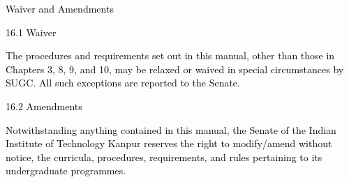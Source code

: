 \documentclass[12pt]{article}
\begin{document}
\vspace{\baselineskip}
{\fontsize{20pt}{24.0pt}\selectfont \textcolor[HTML]{00000A}{Waiver and Amendments}\par}\par


\vspace{\baselineskip}
\textcolor[HTML]{00000A}{16.1 Waiver}\par


\vspace{\baselineskip}
\begin{justify}
{\fontsize{10pt}{12.0pt}\selectfont \textcolor[HTML]{00000A}{The procedures and requirements set out in this manual, other than those in Chapters 3, 8, 9, and 10, may be relaxed or waived in special circumstances by SUGC. All such exceptions are reported to the Senate.}\par}
\end{justify}\par


\vspace{\baselineskip}
\textcolor[HTML]{00000A}{16.2 Amendments}\par


\vspace{\baselineskip}
\begin{justify}
{\fontsize{10pt}{12.0pt}\selectfont \textcolor[HTML]{00000A}{Notwithstanding anything contained in this manual, the Senate of the Indian Institute of Technology Kanpur reserves the right to modify/amend without notice, the curricula, procedures, requirements, and rules pertaining to its undergraduate programmes.}\par}
\end{justify}\par


\vspace{\baselineskip}

\vspace{\baselineskip}

\vspace{\baselineskip}

\vspace{\baselineskip}

\vspace{\baselineskip}

\vspace{\baselineskip}

\vspace{\baselineskip}

\vspace{\baselineskip}
\end{document}
